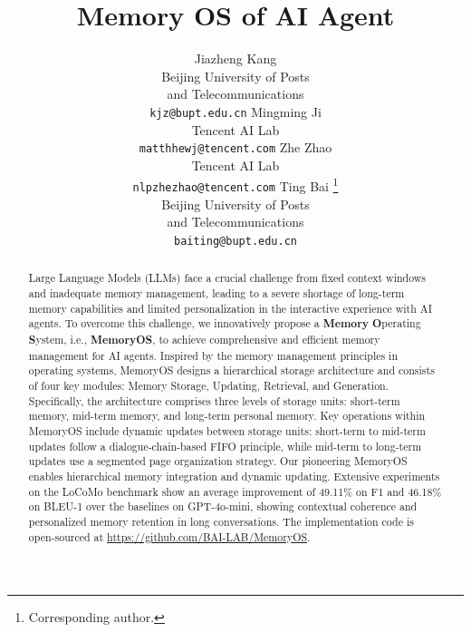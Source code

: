 \documentclass[11pt]{article}
\title{Memory OS of AI Agent}
\author{  
  Jiazheng Kang \\
  Beijing University of Posts \\ and  Telecommunications \\
  \texttt{kjz@bupt.edu.cn}
  \And
  Mingming Ji \\
  Tencent AI Lab \\
  \texttt{matthhewj@tencent.com}
  \AND 
  Zhe Zhao \\
  Tencent AI Lab \\
  \texttt{nlpzhezhao@tencent.com}
  \And
  Ting Bai \thanks{ Corresponding author.}\\
  Beijing University of Posts \\ and Telecommunications \\
  \texttt{baiting@bupt.edu.cn}
}
\begin{document}
\maketitle

\begin{abstract}

Large Language Models (LLMs) face a crucial challenge from fixed context windows and inadequate memory management, leading to a severe shortage of long-term memory capabilities and limited personalization in the interactive experience with AI agents.
To overcome this challenge, we innovatively propose a \textbf{Memory} \textbf{O}perating \textbf{S}ystem, i.e., \textbf{MemoryOS},  to achieve comprehensive and efficient memory management for AI agents. Inspired by the memory management principles in operating systems, MemoryOS designs a hierarchical storage architecture and consists of four key modules: Memory Storage, Updating, Retrieval, and Generation. Specifically, the architecture comprises three levels of storage units: short-term memory, mid-term memory, and long-term personal memory. Key operations within MemoryOS include dynamic updates between storage units: short-term to mid-term updates follow a dialogue-chain-based FIFO principle, while mid-term to long-term updates use a segmented page organization strategy.
Our pioneering MemoryOS enables hierarchical memory integration and dynamic updating. Extensive experiments on the LoCoMo benchmark show an average improvement of 49.11\% on F1 and 46.18\% on BLEU-1 over the baselines on GPT-4o-mini, showing contextual coherence and personalized memory retention in long conversations. The implementation code is open-sourced at \url{https://github.com/BAI-LAB/MemoryOS}.




\end{abstract}
\end{document}
